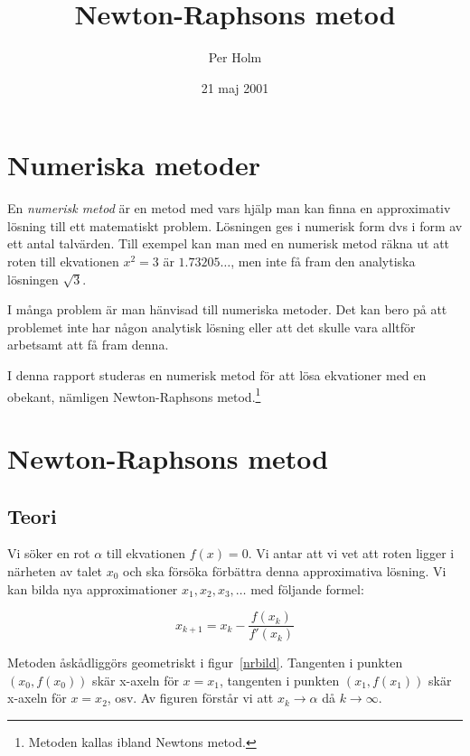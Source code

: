 \documentclass[a4paper]{article}
\title{Newton-Raphsons metod}
\author{Per Holm}
\date{21 maj 2001}           %
\begin{document}

\maketitle                   %

\section{Numeriska metoder}

En \emph{numerisk metod} är en metod med vars hjälp man kan finna en
approximativ lösning till ett matematiskt problem. Lösningen ges i
numerisk form dvs i form av ett antal talvärden. Till exempel kan man
med en numerisk metod räkna ut att roten till ekvationen $x^2 = 3$ är
$1.73205\ldots$, men inte få fram den analytiska lösningen $\sqrt 3$.

I många problem är man hänvisad till numeriska metoder. Det kan
bero på att problemet inte har någon analytisk lösning eller att det
skulle vara alltför arbetsamt att få fram denna.

I denna rapport studeras en numerisk metod för att lösa ekvationer
med en obekant, nämligen Newton-Raphsons metod.\footnote{Metoden kallas ibland Newtons metod.}



\section{Newton-Raphsons metod}


\subsection{Teori}

Vi söker en rot $\alpha$ till ekvationen $f(x) = 0$. Vi antar att vi vet att
roten ligger i närheten av talet $x_0$ och ska försöka förbättra denna
approximativa lösning.  Vi kan bilda nya approximationer $x_1, x_2, x_3,
   \ldots$ med följande formel:

\begin{equation}
   x_{k+1} = x_k - \frac{f(x_k)}{f'(x_k)}
   \label{nrekv}
\end{equation}

\noindent Metoden åskådliggörs geometriskt i figur~\ref{nrbild}. Tangenten i punkten
$(x_0,f(x_0))$ skär x-axeln för $x = x_1$, tangenten i punkten $(x_1,f(x_1))$
skär x-axeln för $x = x_2$, osv. Av figuren förstår vi att $x_k \rightarrow
   \alpha$ då $k \rightarrow \infty$.
\end{document}
